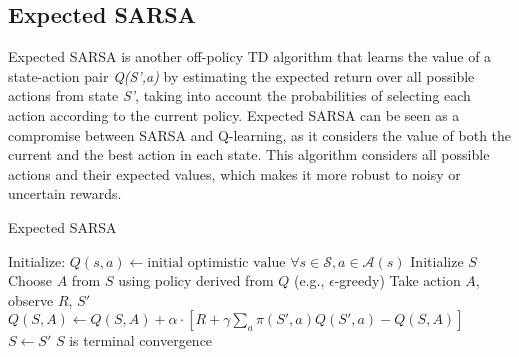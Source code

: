 \subsection{Expected SARSA}
Expected SARSA is another off-policy TD algorithm that learns the value of a state-action pair \textit{Q(S',a)} by estimating the expected return over all possible actions from state \textit{S'}, taking into account the probabilities of selecting each action according to the current policy. Expected SARSA can be seen as a compromise between SARSA and Q-learning, as it considers the value of both the current and the best action in each state. This algorithm considers all possible actions and their expected values, which makes it more robust to noisy or uncertain rewards. 
\begin{algorithm}
\caption{Expected SARSA}\label{algo:ES}
\begin{algorithmic}[1]
\State Initialize:
\State \hspace{0.5cm} $Q(s,a) \gets \text{initial optimistic value } \forall s\in \mathcal{S}, a\in \mathcal{A}(s)$
\Repeat
\State Initialize $S$
\Repeat
\State Choose $A$ from $S$ using policy derived from $Q$ (e.g., $\epsilon$-greedy)
\State Take action $A$, observe $R$, $S'$
\State $Q(S,A) \gets Q(S,A) + \alpha \cdot [R + \gamma\sum_{a}\pi(S', a)Q(S',a) - Q(S,A)]$
\State $S \gets S'$
\Until $S$ is terminal
\Until convergence
\end{algorithmic}
\end{algorithm}


